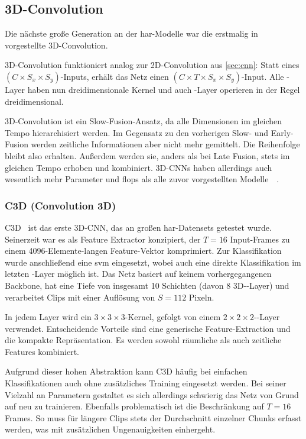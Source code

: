 \subsection{3D-Convolution}
\label{subsec:3d-conv}

Die nächste große Generation an der \gls{har}-Modelle war die erstmalig in~\cite{Ji13} vorgestellte 3D-Convolution.

3D-Convolution funktioniert analog zur 2D-Convolution aus \autoref{sec:cnn}:
Statt eines $(C \times S_x \times S_y)$-Inputs, erhält das Netz einen $(C \times T \times S_x \times S_y)$-Input.
Alle \conv-Layer haben nun dreidimensionale Kernel und auch \pool-Layer operieren in der Regel dreidimensional.

3D-Convolution ist ein Slow-Fusion-Ansatz, da alle Dimensionen im gleichen Tempo hierarchisiert werden.
Im Gegensatz zu den vorherigen Slow- und Early-Fusion werden zeitliche Informationen aber nicht mehr gemittelt.
Die Reihenfolge bleibt also erhalten.
Außerdem werden sie, anders als bei Late Fusion, stets im gleichen Tempo erhoben und kombiniert.
3D-CNNs haben allerdings auch wesentlich mehr Parameter und \gls{flops} als alle zuvor vorgestellten Modelle~\cite{Zhu19}~\cite{Carreira17}.

\subsubsection*{C3D (Convolution 3D)}

C3D~\cite{Tran15} ist das erste 3D-CNN, das an großen \gls{har}-Datensets getestet wurde.
Seinerzeit war es als Feature Extractor konzipiert, der $T=16$ Input-Frames zu einem 4096-Elemente-langen Feature-Vektor komprimiert.
Zur Klassifikation wurde anschließend eine \gls{svm} eingesetzt, wobei auch eine direkte Klassifikation im letzten \fc-Layer möglich ist.
Das Netz basiert auf keinem vorhergegangenen Backbone, hat eine Tiefe von insgesamt 10 Schichten (davon 8 3D-\conv-Layer) und verarbeitet Clips mit einer Auflösung von $S=112$ Pixeln.

In jedem Layer wird ein $3 \times 3 \times 3$-Kernel, gefolgt von einem $2 \times 2 \times 2$-\pool-Layer verwendet.
Entscheidende Vorteile sind eine generische Feature-Extraction und die kompakte Repräsentation.
Es werden sowohl räumliche als auch zeitliche Features kombiniert.

Aufgrund dieser hohen Abstraktion kann C3D häufig bei einfachen Klassifikationen auch ohne zusätzliches Training eingesetzt werden.
Bei seiner Vielzahl an Parametern gestaltet es sich allerdings schwierig das Netz von Grund auf neu zu trainieren.
Ebenfalls problematisch ist die Beschränkung auf $T=16$ Frames.
So muss für längere Clips stets der Durchschnitt einzelner Chunks erfasst werden, was mit zusätzlichen Ungenauigkeiten einhergeht.

